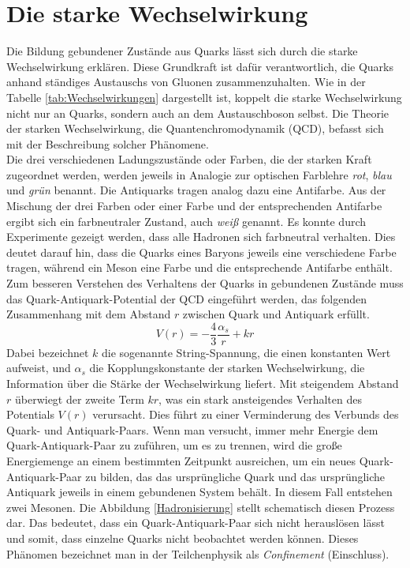 \documentclass[12pt,a4paper]{report}
\begin{document}
\section{Die starke Wechselwirkung}
\label{sec:starkeWW}
Die Bildung gebundener Zustände aus Quarks lässt sich durch die starke Wechselwirkung erklären. Diese Grundkraft ist dafür verantwortlich, die Quarks anhand ständiges Austauschs von Gluonen zusammenzuhalten. Wie in der Tabelle \ref{tab:Wechselwirkungen} dargestellt ist, koppelt die starke Wechselwirkung nicht nur an Quarks, sondern auch an dem Austauschboson selbst. Die Theorie der starken Wechselwirkung, die Quantenchromodynamik (QCD), befasst sich mit der Beschreibung solcher Phänomene. \\
Die drei verschiedenen Ladungszustände oder Farben, die der starken Kraft zugeordnet werden, werden jeweils in Analogie zur optischen Farblehre \textit{rot}, \textit{blau} und \textit{grün} benannt. Die Antiquarks tragen analog dazu eine Antifarbe. Aus der Mischung der drei Farben oder einer Farbe und der entsprechenden Antifarbe ergibt sich ein farbneutraler Zustand, auch \textit{weiß} genannt. Es konnte durch Experimente gezeigt werden, dass alle Hadronen sich farbneutral verhalten. Dies deutet darauf hin, dass die Quarks eines Baryons jeweils eine verschiedene Farbe tragen, während ein Meson eine Farbe und die entsprechende Antifarbe enthält.\\
Zum besseren Verstehen des Verhaltens der Quarks in gebundenen Zustände muss das Quark-Antiquark-Potential der QCD eingeführt werden, das folgenden Zusammenhang mit dem Abstand $r$ zwischen Quark und Antiquark erfüllt.\\
\begin{equation} \label{eq:PotentialQCD}
  V(r)=-\dfrac{4}{3}\dfrac{\alpha_{s}}{r}+kr
\end{equation}
Dabei bezeichnet $k$ die sogenannte String-Spannung, die einen konstanten Wert aufweist, und $\alpha_{s}$ die Kopplungskonstante der starken Wechselwirkung, die Information über die Stärke der Wechselwirkung liefert. Mit steigendem Abstand $r$ überwiegt der zweite Term $kr$, was ein stark ansteigendes Verhalten des Potentials $V(r)$ verursacht. Dies führt zu einer Verminderung des Verbunds des Quark- und Antiquark-Paars. Wenn man versucht, immer mehr Energie dem Quark-Antiquark-Paar zu zuführen, um es zu trennen, wird die große Energiemenge an einem bestimmten Zeitpunkt ausreichen, um ein neues Quark-Antiquark-Paar zu bilden, das das ursprüngliche Quark und das ursprüngliche Antiquark jeweils in einem gebundenen System behält. In diesem Fall entstehen zwei Mesonen. Die Abbildung \ref{Hadronisierung} stellt schematisch diesen Prozess dar. Das bedeutet, dass ein Quark-Antiquark-Paar sich nicht herauslösen lässt und somit, dass einzelne Quarks nicht beobachtet werden können. Dieses Phänomen bezeichnet man in der Teilchenphysik als \textit{Confinement} (Einschluss). 
\end{document}
